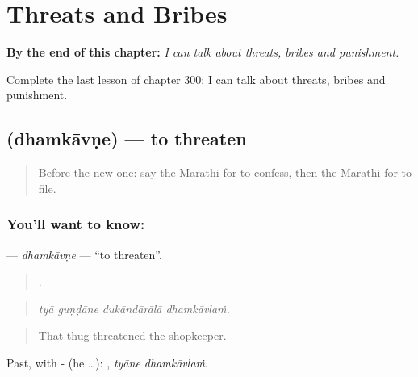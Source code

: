 
\chapter{Threats and Bribes}
\label{ch:mr-threats-and-bribes}

\begin{chapteropening}
\textbf{By the end of this chapter:} \emph{I can talk about threats, bribes and punishment.}

Complete the last lesson of chapter 300: I can talk about threats, bribes and punishment.
\end{chapteropening}

\section[\texorpdfstring{\mr{धमकावणे} (dhamkāvṇe)}{धमकावणे (dhamkāvṇe)}]{ (dhamkāvṇe) — to threaten}

\label{lesson:MR-C300-dhamkavne}



\begin{quote}
Before the new one: say the Marathi for to confess, then the Marathi for to file.
\end{quote}

\subsection*{You'll want to know: }
\textbf{} — \emph{dhamkāvṇe} — \textquotedblleft{}to threaten\textquotedblright{}.

\begin{quote}
   .
\end{quote}

\begin{quote}
\emph{tyā guṇḍāne dukāndārālā dhamkāvlaṁ.}
\end{quote}

\begin{quote}
That thug threatened the shopkeeper.
\end{quote}

Past, with - (he …):  , \emph{tyāne dhamkāvlaṁ}.

